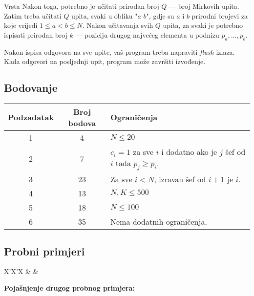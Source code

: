 \begin{statement}[
  problempoints=100,
  timelimit=1 sekunda,
  memorylimit=512 MiB,
]{Vrsta}
Nakon toga, potrebno je učitati prirodan broj $Q$ — broj Mirkovih upita. Zatim treba učitati $Q$ upita, svaki u obliku "$a$ $b$", gdje su $a$ i $b$ prirodni brojevi za koje vrijedi $1 \le a < b \le N$. Nakon učitavanja svih $Q$ upita, za svaki je potrebno ispisati prirodan broj $k$ — poziciju drugog najvećeg elementa u podnizu $p_a, \ldots, p_b$.

Nakon ispisa odgovora na sve upite, vaš program treba napraviti \textit{flush} izlaza. Kada odgovori na posljednji upit, program može završiti izvođenje.

\subsection*{Bodovanje}


{\renewcommand{\arraystretch}{1.4}
  \setlength{\tabcolsep}{6pt}
  \begin{tabular}{ccl}
   Podzadatak & Broj bodova & Ograničenja \\ \midrule
   	1 & 4 & $N \leq 20$ \\
    2 & 7 & $c_i = 1$ za sve $i$ i dodatno ako je $j$ šef od $i$ tada $p_j \geq p_i$. \\
    3 & 23 & Za sve $i < N$, izravan šef od $i + 1$ je $i$. \\
    4 & 13 & $N, K \leq 500$ \\
    5 & 18 & $N \leq 100$ \\
    6 & 35 & Nema dodatnih ograničenja. \\
\end{tabular}}

\subsection*{Probni primjeri}
\begin{tabularx}{\textwidth}{X'X'X}
 &
 &
\end{tabularx}

\textbf{Pojašnjenje drugog probnog primjera:}\\


\end{statement}

